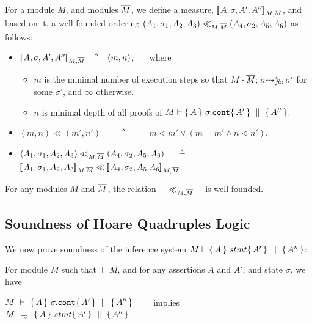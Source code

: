 {
\begin{definition}
For a module $M$, and modules $\overline{M}$,   we define a measure, $[\!\![\, A, \sigma,A',A'' ]\!\!]\,_{M,\overline{M}} $, and based on it, a well founded ordering $(A_1,\sigma_1,A_2, A_3) \ll_{M,\overline{M}}  (A_4,\sigma_2,A_5,A_6)$
as follows:
\begin{itemize}
\item
 $[\!\![\, A, \sigma,A',A'' ]\!\!]\,_{M,\overline{M}} \  \ \triangleq \ \  (m, n)$,  \ \ \  where
\begin{itemize}
\item
$m$ is the minimal number of execution steps so that $ M\cdot \overline{M};\, {\sigma} {\rightsquigarrow^*}\!\!_{\mathit{fin}}\, \sigma'$  for some $\sigma'$, {and $\infty$ otherwise}.
 \item
  $n$ is minimal depth of all proofs of $M \vdash  \{\, A \, \}\ \sigma.\mbox{\normalfont{\texttt{cont}}} \{\, A' \, \} \, \,\parallel\,\, \{\, A'' \, \}  $.
\end{itemize}
 \item
 $(m,n) \ll (m',n')$\ \  \ \ $\triangleq$ \ \  \ \ $ m<m'\vee  (m=m'  \wedge n < n')   $.
\item
$(A_1,\sigma_1,A_2, A_3) \ll_{M,\overline{M}}  (A_4,\sigma_2,A_5, A_6)$  \  \  $\triangleq$ \ \ 
$\measure {A_1, \sigma_1,A_2, A_3} {M,\Mtwo}  \ll \measure {A_4, \sigma_2,A_5. A_6} {M,\Mtwo} $
\end{itemize}
\end{definition}
}


\begin{auxLemma}
\label{lemma:normal:two}
For any modules $M$ and $\overline{M}$,  the relation $\_ \ll_{M,\overline{M}}  \_$ is well-founded.
\end{auxLemma}



\subsection{ Soundness of  Hoare Quadruples Logic}
\label{sect:prove:sound:quadruples}
We now prove soundness of the inference system $M \vdash   \{\, A \, \}\ stmt \{\, A' \, \} \, \,\parallel\,\, \{\, A'' \, \} $:


\begin{theorem}
\label{t:quadruple:sound}
For module  $M$ %
such that  $\vdash M$, and for any assertions $A$ and $A'$, and state  $\sigma$, we have

\begin{center}
$M\ \vdash\   \{\, A \, \}\ \sigma.\mbox{\normalfont{\texttt{cont}}} \{\, A' \, \} \, \,\parallel\,\, \{\, A'' \, \} $ \ \ \ \ implies \ \ \ \ $M\ \models\!\!\!\!_{_{\circ}}\ \   \{\, A \, \}\ stmt \{\, A' \, \} \, \,\parallel\,\, \{\, A'' \, \} $
\end{center}

\end{theorem}

